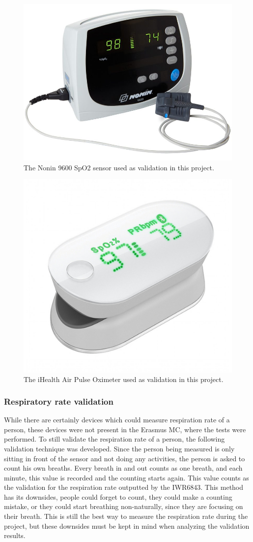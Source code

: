 \begin{figure}[t]
    \centering
    \includegraphics[width=.4\textwidth]{figures/validation/nonin_9600.jpg}
    \caption{The Nonin 9600 SpO2 sensor used as validation in this project.}
    \label{fig:nonin_9600}
\end{figure}

\begin{figure}[t]
    \centering
    \includegraphics[width=.3\textwidth]{figures/validation/ihealth.jpg}
    \caption{The iHealth Air Pulse Oximeter used as validation in this project.}
    \label{fig:ihealth}
\end{figure}

\subsubsection{Respiratory rate validation}
While there are certainly devices which could measure respiration rate of a person, these devices were not present in the Erasmus MC, where the tests were performed. To still validate the respiration rate of a person, the following validation technique was developed. Since the person being measured is only sitting in front of the sensor and not doing any activities, the person is asked to count his own breaths. Every breath in and out counts as one breath, and each minute, this value is recorded and the counting starts again. This value counts as the validation for the respiration rate outputted by the IWR6843. This method has its downsides, people could forget to count, they could make a counting mistake, or they could start breathing non-naturally, since they are focusing on their breath. This is still the best way to measure the respiration rate during the project, but these downsides must be kept in mind when analyzing the validation results.

